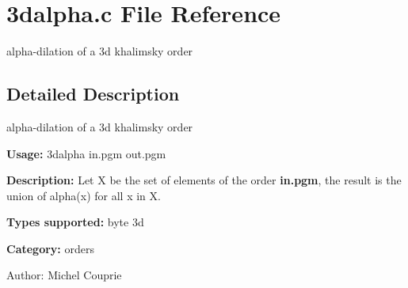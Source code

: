 \section{3dalpha.c File Reference}
\label{3dalpha_8c}
alpha-dilation of a 3d khalimsky order 



\subsection{Detailed Description}
alpha-dilation of a 3d khalimsky order 

{\bf Usage:} 3dalpha in.pgm out.pgm

{\bf Description:} Let X be the set of elements of the order {\bf in.pgm}, the result is the union of alpha(x) for all x in X.

{\bf Types supported:} byte 3d

{\bf Category:} orders

\begin{Desc}
\item[Author:]Michel Couprie \end{Desc}
